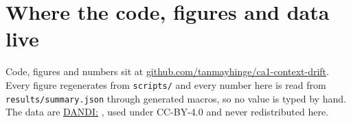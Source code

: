 \documentclass[11pt,a4paper]{article}
\begin{document}
\section{Where the code, figures and data live}

Code, figures and numbers sit at
\href{https://github.com/tanmayhinge/ca1-context-drift}{github.com/tanmayhinge/ca1-context-drift}.
Every figure regenerates from \texttt{scripts/} and every number here is read from
\texttt{results/summary.json} through generated macros, so no value is typed by hand. The data
are \href{https://dandiarchive.org/dandiset/000718}{DANDI:\numDatasetDandiset{}}
\citep{dandi000718}, used under CC-BY-4.0 and never redistributed here.

\small
\setlength{\bibsep}{3pt plus 1pt}


\end{document}
